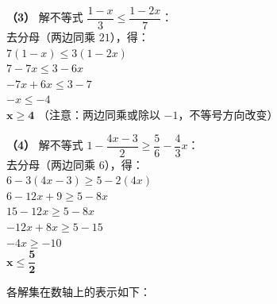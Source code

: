 \textbf{（3）} 解不等式 $\dfrac{1-x}{3} \leqslant \dfrac{1-2x}{7}$：\\
\hspace*{0.8cm} 去分母（两边同乘 $21$），得：\\
\hspace*{0.8cm} $7(1 - x) \leqslant 3(1 - 2x)$\\
\hspace*{0.8cm} $7 - 7x \leqslant 3 - 6x$\\
\hspace*{0.8cm} $-7x + 6x \leqslant 3 - 7$\\
\hspace*{0.8cm} $-x \leqslant -4$\\
\hspace*{0.8cm} $\boldsymbol{x \geqslant 4}$ （注意：两边同乘或除以 $-1$，不等号方向改变）

\textbf{（4）} 解不等式 $1 - \dfrac{4x-3}{2} \geqslant \dfrac{5}{6} - \dfrac{4}{3}x$：\\
\hspace*{0.8cm} 去分母（两边同乘 $6$），得：\\
\hspace*{0.8cm} $6 - 3(4x - 3) \geqslant 5 - 2(4x)$\\
\hspace*{0.8cm} $6 - 12x + 9 \geqslant 5 - 8x$\\
\hspace*{0.8cm} $15 - 12x \geqslant 5 - 8x$\\
\hspace*{0.8cm} $-12x + 8x \geqslant 5 - 15$\\
\hspace*{0.8cm} $-4x \geqslant -10$\\
\hspace*{0.8cm} $\boldsymbol{x \leqslant \dfrac{5}{2}}$

\vspace{0.4cm}
各解集在数轴上的表示如下：

\vspace{0.4cm}

